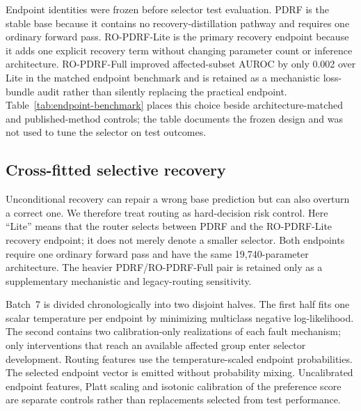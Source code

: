 \documentclass[11pt]{article}
\begin{document}
Endpoint identities were frozen before selector test evaluation. PDRF is the stable base because it contains no recovery-distillation pathway and requires one ordinary forward pass. RO-PDRF-Lite is the primary recovery endpoint because it adds one explicit recovery term without changing parameter count or inference architecture. RO-PDRF-Full improved affected-subset AUROC by only 0.002 over Lite in the matched endpoint benchmark and is retained as a mechanistic loss-bundle audit rather than silently replacing the practical endpoint. Table~\ref{tab:endpoint-benchmark} places this choice beside architecture-matched and published-method controls; the table documents the frozen design and was not used to tune the selector on test outcomes.

\begin{table}[ht]
\centering
\caption{\textbf{Concise endpoint benchmark and routing role.} Affected-subset macro-AUROC values summarize the matched chemical-array endpoint study over 10 optimization seeds. Parameter counts exclude the downstream logistic selector. Endpoint identity was frozen before the selective-recovery test audit.}
\label{tab:endpoint-benchmark}
\resizebox{0.96\textwidth}{!}{}
\end{table}

\subsection{Cross-fitted selective recovery}

Unconditional recovery can repair a wrong base prediction but can also overturn a correct one. We therefore treat routing as hard-decision risk control. Here ``Lite'' means that the router selects between PDRF and the RO-PDRF-Lite recovery endpoint; it does not merely denote a smaller selector. Both endpoints require one ordinary forward pass and have the same 19,740-parameter architecture. The heavier PDRF/RO-PDRF-Full pair is retained only as a supplementary mechanistic and legacy-routing sensitivity.

Batch~7 is divided chronologically into two disjoint halves. The first half fits one scalar temperature per endpoint by minimizing multiclass negative log-likelihood. The second contains two calibration-only realizations of each fault mechanism; only interventions that reach an available affected group enter selector development. Routing features use the temperature-scaled endpoint probabilities. The selected endpoint vector is emitted without probability mixing. Uncalibrated endpoint features, Platt scaling and isotonic calibration of the preference score are separate controls rather than replacements selected from test performance.
\end{document}
